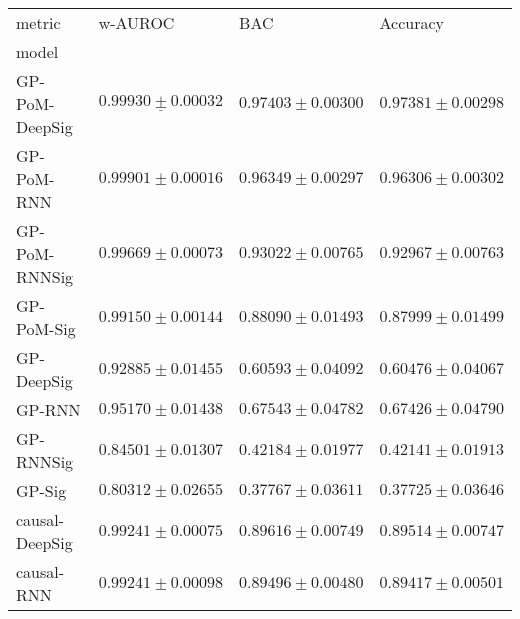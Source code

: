 \begin{tabular}{llll}
\toprule
metric &                                           w-AUROC &                                               BAC &                                          Accuracy \\
model          &                                                   &                                                   &                                                   \\
\midrule
GP-PoM-DeepSig &            $  \underline{ 0.99930 \pm 0.00032 } $ &               $  \mathbf{ 0.97403 \pm 0.00300 } $ &               $  \mathbf{ 0.97381 \pm 0.00298 } $ \\
GP-PoM-RNN     &                           $ 0.99901 \pm 0.00016 $ &                           $ 0.96349 \pm 0.00297 $ &                           $ 0.96306 \pm 0.00302 $ \\
GP-PoM-RNNSig  &                           $ 0.99669 \pm 0.00073 $ &                           $ 0.93022 \pm 0.00765 $ &                           $ 0.92967 \pm 0.00763 $ \\
GP-PoM-Sig     &                           $ 0.99150 \pm 0.00144 $ &                           $ 0.88090 \pm 0.01493 $ &                           $ 0.87999 \pm 0.01499 $ \\
GP-DeepSig     &                           $ 0.92885 \pm 0.01455 $ &                           $ 0.60593 \pm 0.04092 $ &                           $ 0.60476 \pm 0.04067 $ \\
GP-RNN         &                           $ 0.95170 \pm 0.01438 $ &                           $ 0.67543 \pm 0.04782 $ &                           $ 0.67426 \pm 0.04790 $ \\
GP-RNNSig      &                           $ 0.84501 \pm 0.01307 $ &                           $ 0.42184 \pm 0.01977 $ &                           $ 0.42141 \pm 0.01913 $ \\
GP-Sig         &                           $ 0.80312 \pm 0.02655 $ &                           $ 0.37767 \pm 0.03611 $ &                           $ 0.37725 \pm 0.03646 $ \\
causal-DeepSig &                           $ 0.99241 \pm 0.00075 $ &                           $ 0.89616 \pm 0.00749 $ &                           $ 0.89514 \pm 0.00747 $ \\
causal-RNN     &                           $ 0.99241 \pm 0.00098 $ &                           $ 0.89496 \pm 0.00480 $ &                           $ 0.89417 \pm 0.00501 $ \\

\end{tabular}

